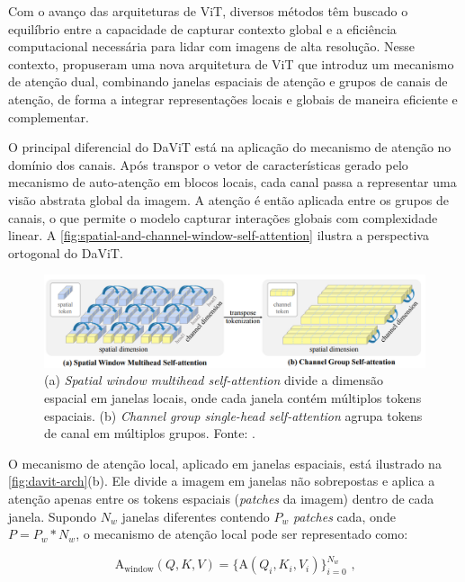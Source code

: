 Com o avanço das arquiteturas de ViT, diversos métodos têm buscado o equilíbrio entre a capacidade de capturar contexto global e a eficiência computacional necessária para lidar com imagens de alta resolução. Nesse contexto,  propuseram uma nova arquitetura de ViT que introduz um mecanismo de atenção dual, combinando janelas espaciais de atenção e grupos de canais de atenção, de forma a integrar representações locais e globais de maneira eficiente e complementar.

O principal diferencial do DaViT está na aplicação do mecanismo de atenção no domínio dos canais. Após transpor o vetor de características gerado pelo mecanismo de auto-atenção em blocos locais, cada canal passa a representar uma visão abstrata global da imagem. A atenção é então aplicada entre os grupos de canais, o que permite o modelo capturar interações globais com complexidade linear. A \autoref{fig:spatial-and-channel-window-self-attention} ilustra a perspectiva ortogonal do DaViT.

\begin{figure}[!htbp]
    \centering
    \includegraphics[width=\linewidth]{figs/spatial-and-channel-window-self-attention.png}
    \caption{(a) \textit{Spatial window multihead self-attention} divide a dimensão espacial em janelas locais, onde cada janela contém múltiplos tokens espaciais. (b) \textit{Channel group single-head self-attention} agrupa tokens de canal em múltiplos grupos. Fonte: .}
    \label{fig:spatial-and-channel-window-self-attention}
\end{figure}

O mecanismo de atenção local, aplicado em janelas espaciais, está ilustrado na \autoref{fig:davit-arch}(b). Ele divide a imagem em janelas não sobrepostas e aplica a atenção apenas entre os tokens espaciais (\textit{patches} da imagem) dentro de cada janela. Supondo $N_w$ janelas diferentes contendo $P_w$ \textit{patches} cada, onde $P=P_w * N_w$, o mecanismo de atenção local pode ser representado como:

\begin{equation}
    \text{A}_{\text{window}}(Q, K, V) = \lbrace \text{A}(Q_i,K_i,V_i) \rbrace ^{N_w}_{i=0} \text{ ,}
\end{equation}

